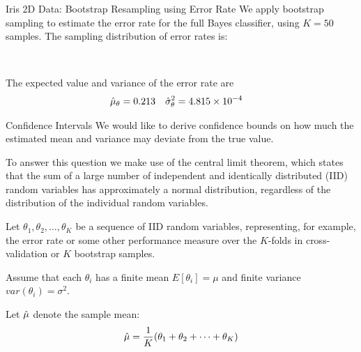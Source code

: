 \def\pshlabel#1{\scriptsize {#1}}
\def\psvlabel#1{\scriptsize {#1}}
\begin{frame}{Iris 2D Data: Bootstrap Resampling using Error Rate}
We apply bootstrap sampling to estimate the error rate
 for the full Bayes classif\/{i}er, using $K=50$ samples. The sampling
  distribution of error rates is:
  \begin{center}
\begin{figure}%
\end{figure}
\end{center}
\centerline{~}
\bigskip
The expected value and
  variance of the error rate are
  \begin{align*}
  \hat{\mu}_\theta &= 0.213 &
  \hat{\sigma}^2_\theta & = 4.815 \times 10^{-4}
  \end{align*}
\end{frame}





\begin{frame}{Conf\/{i}dence Intervals}
We would like to derive conf\/{i}dence bounds on how
much the estimated mean and variance may deviate from the true value.

\medskip
To answer this question we make use of the
central limit theorem, which states that the sum of a large number of
independent and identically distributed (IID) random variables has
approximately a normal distribution, regardless of the distribution of
the individual random variables. 

\medskip
Let $\theta_1, \theta_2, \ldots,
\theta_K$ be a sequence of IID random variables,
representing, for example, the error rate or some other performance
measure over the $K$-folds in cross-validation or $K$ bootstrap samples.

\medskip
Assume that each $\theta_i$ has a f\/{i}nite mean
$E[\theta_i] = \mu$ and f\/{i}nite variance $var(\theta_i) = \sigma^2$.

\medskip
Let $\hat{\mu}$ denote the sample mean:
\begin{align*}
  \hat{\mu} = {1\over K} (\theta_1 + \theta_2 + \cdots + \theta_K)
\end{align*}
\end{frame}


